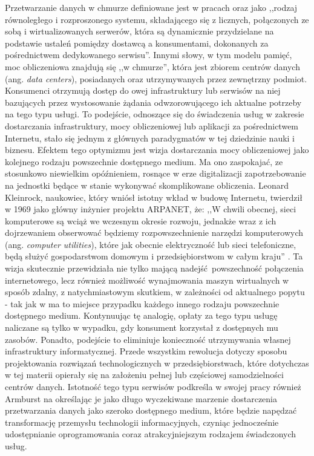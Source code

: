 \documentclass[12pt,a4paper,twoside]{article}
\begin{document}
Przetwarzanie danych w chmurze definiowane jest w pracach \citet{buyya2009} oraz \citet{calheiros2010} jako ,,rodzaj równoległego i rozproszonego systemu, składającego się z licznych, połączonych ze sobą i wirtualizowanych serwerów, która są dynamicznie przydzielane na podstawie ustaleń pomiędzy dostawcą a konsumentami, dokonanych za pośrednictwem dedykowanego serwisu''. Innymi słowy, w tym modelu pamięć, moc obliczeniowa znajdują się ,,w chmurze'', która jest zbiorem centrów danych (ang. \textit{data centers}), posiadanych oraz utrzymywanych przez zewnętrzny podmiot. Konsumenci otrzymują dostęp do owej infrastruktury lub serwisów na niej bazujących przez wystosowanie żądania odwzorowującego ich aktualne potrzeby na tego typu usługi. To podejście, odnoszące się do świadczenia usług w zakresie dostarczania infrastruktury, mocy obliczeniowej lub aplikacji za pośrednictwem Internetu, stało się jednym z głównych paradygmatów w tej dziedzinie nauki i biznesu. Efektem tego optymizmu jest wizja dostarczania mocy obliczeniowej jako kolejnego rodzaju powszechnie dostępnego medium. Ma ono zaspokajać, ze stosunkowo niewielkim opóźnieniem, rosnące w erze digitalizacji zapotrzebowanie na jednostki będące w stanie wykonywać skomplikowane obliczenia. Leonard Kleinrock, naukowiec, który wniósł istotny wkład w budowę Internetu, twierdził w 1969 jako główny inżynier projektu ARPANET, że: ,,W chwili obecnej, sieci komputerowe są wciąż we wczesnym okresie rozwoju, jednakże wraz z ich dojrzewaniem obserwować będziemy rozpowszechnienie narzędzi komputerowych (ang. \textit{computer utilities}), które jak obecnie elektryczność lub sieci telefoniczne, będą służyć gospodarstwom domowym i przedsiębiorstwom w całym kraju''  \citep{kleinrock2005}. Ta wizja skutecznie przewidziała nie tylko mającą nadejść powszechność połączenia internetowego, lecz również możliwość wynajmowania maszyn wirtualnych w sposób zdalny, z natychmiastowym skutkiem, w zależności od aktualnego popytu - tak jak w ma to miejsce przypadku każdego innego rodzaju powszechnie dostępnego medium. Kontynuując tę analogię, opłaty za tego typu usługę naliczane są tylko w wypadku, gdy konsument korzystał z dostępnych mu zasobów. Ponadto, podejście to eliminiuje konieczność utrzymywania własnej infrastruktury informatycznej. Przede wszystkim rewolucja dotyczy sposobu projektowania rozwiązań technologicznych w przedsiębiorstwach, które dotychczas w tej materii opierały się na założeniu pełnej lub częściowej samodzielności centrów danych. Istotność tego typu serwisów podkreśla w swojej pracy również Armburst \citep{armburst2010} na określając je jako długo wyczekiwane marzenie dostarczenia przetwarzania danych jako szeroko dostępnego medium, które będzie napędzać transformację przemysłu technologii informacyjnych, czyniąc jednocześnie udostępnianie oprogramowania coraz atrakcyjniejszym rodzajem świadczonych usług.
\end{document}
